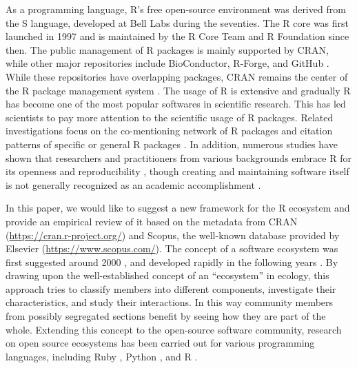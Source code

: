 As a programming language, R's free open-source environment was derived
from the S language, developed at Bell Labs during the seventies. The R
core was first launched in 1997 and is maintained by the R Core Team and
R Foundation since then. The public management of R packages is mainly
supported by CRAN, while other major repositories include BioConductor,
R-Forge, and GitHub \citep{GermanAdams-562, PlakidasSchall-561}. While
these repositories have overlapping packages, CRAN remains the center of
the R package management system \citep{DecanMens-557}. The usage of R is
extensive and gradually R has become one of the most popular softwares
in scientific research. This has led scientists to pay more attention to
the scientific usage of R packages. Related investigations focus on the
co-mentioning network of R packages \citep{LiYan-560} and citation
patterns of specific or general R packages
\citep{LiChen-558, LiYan-559}. In addition, numerous studies have shown
that researchers and practitioners from various backgrounds embrace R
for its openness and reproducibility
\citep{GentlemanCarey-499, PebesmaNst-498, HuberCarey-496, LowndesBest-495, KayaAgca-491, LaiLortie-492},
though creating and maintaining software itself is not generally
recognized as an academic accomplishment \citep{YangRousseau}.

In this paper, we would like to suggest a new framework for the R
ecosystem and provide an empirical review of it based on the metadata
from CRAN (\url{https://cran.r-project.org/}) and Scopus, the well-known
database provided by Elsevier (\url{https://www.scopus.com/}). The
concept of a software ecosystem was first suggested around 2000
\citep{MesserschmittSzyperski-609}, and developed rapidly in the
following years
\citep{IansitiLevien-615, Hanssen-614, ManikasHansen-611, Jansen-613}.
By drawing upon the well-established concept of an ``ecosystem'' in
ecology, this approach tries to classify members into different
components, investigate their characteristics, and study their
interactions. In this way community members from possibly segregated
sections benefit by seeing how they are part of the whole. Extending
this concept to the open-source software community, research on open
source ecosystems has been carried out for various programming
languages, including Ruby \citep{KabbedijkJansen-623, SyeedHansen-624},
Python \citep{HovingSlot-617}, and R
\citep{GermanAdams-562, PlakidasSchall-561, DecanMens-557}.

